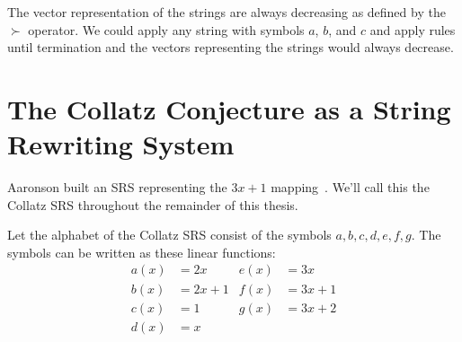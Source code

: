 \par
The vector representation of the strings are always decreasing as defined by the $\succ$ operator. We could apply any string with symbols $a$, $b$, and $c$ and apply rules until termination and the vectors representing the strings would always decrease.
\section{The Collatz Conjecture as a String Rewriting System} \label{subsec:CollatzSRS}
Aaronson built an SRS representing the $3x+1$ mapping~\cite{HeuleAaronson}. We'll call this the Collatz SRS throughout the remainder of this thesis. \par
Let the alphabet of the Collatz SRS consist of the symbols $a, b, c, d, e, f, g$. The symbols can be written as these linear functions:
\begin{align*}
  a(x) &= 2x & e(x) &= 3x \\
  b(x) &= 2x+1 & f(x) &= 3x+1 \\
  c(x) &= 1 & g(x) &= 3x+2 \\
  d(x) &= x & & 
\end{align*}

